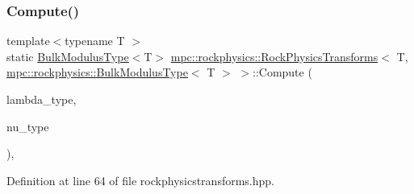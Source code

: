 \subsubsection{\texorpdfstring{Compute()}{Compute()}\hspace{0.1cm}{\footnotesize\ttfamily [3/8]}}
{\footnotesize\ttfamily template$<$typename T $>$ \\
static \mbox{\hyperlink{structmpc_1_1rockphysics_1_1_bulk_modulus_type}{Bulk\+Modulus\+Type}}$<$T$>$ \mbox{\hyperlink{structmpc_1_1rockphysics_1_1_rock_physics_transforms}{mpc\+::rockphysics\+::\+Rock\+Physics\+Transforms}}$<$ T, \mbox{\hyperlink{structmpc_1_1rockphysics_1_1_bulk_modulus_type}{mpc\+::rockphysics\+::\+Bulk\+Modulus\+Type}}$<$ T $>$ $>$\+::Compute (\begin{DoxyParamCaption}\item[{const \mbox{\hyperlink{structmpc_1_1rockphysics_1_1_lame_paramter_modulus_type}{mpc\+::rockphysics\+::\+Lame\+Paramter\+Modulus\+Type}}$<$ T $>$ \&}]{lambda\+\_\+type,  }\item[{const \mbox{\hyperlink{structmpc_1_1rockphysics_1_1_poissons_ratio_type}{mpc\+::rockphysics\+::\+Poissons\+Ratio\+Type}}$<$ T $>$ \&}]{nu\+\_\+type }\end{DoxyParamCaption})\hspace{0.3cm}{\ttfamily [inline]}, {\ttfamily [static]}}



Definition at line 64 of file rockphysicstransforms.\+hpp.

\mbox{\label{structmpc_1_1rockphysics_1_1_rock_physics_transforms_3_01_t_00_01mpc_1_1rockphysics_1_1_bulk_modulus_type_3_01_t_01_4_01_4_a00fc599b2bb932d0ea34ff4856b14263}} 
